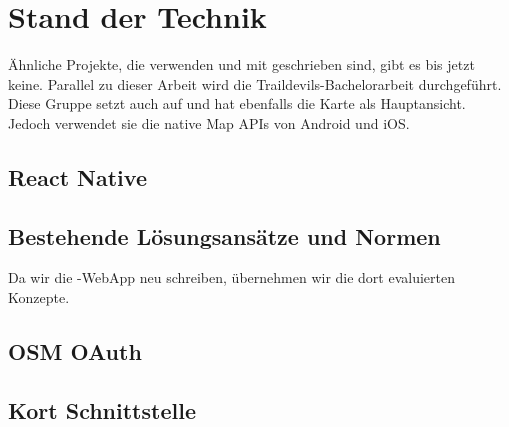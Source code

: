 \chapter{Stand der Technik}
\label{tb-stand-der-technik}
Ähnliche Projekte, die  verwenden und mit  geschrieben sind, gibt es bis jetzt keine.
Parallel zu dieser Arbeit wird die Traildevils-Bachelorarbeit durchgeführt.
Diese Gruppe setzt auch auf  und hat ebenfalls die Karte als Hauptansicht.
Jedoch verwendet sie die native Map APIs von Android und iOS.

\section{React Native}


\section{Bestehende Lösungsansätze und Normen}
Da wir die \kort{}-\gls{WebApp} neu schreiben, übernehmen wir die dort evaluierten Konzepte.


\section{OSM OAuth}


\section{Kort Schnittstelle}

